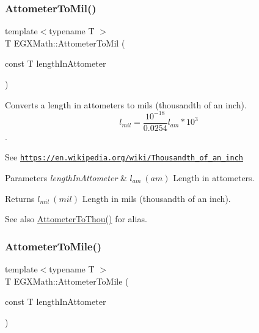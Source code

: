 \subsubsection{\texorpdfstring{Attometer\+To\+Mil()}{AttometerToMil()}}
{\footnotesize\ttfamily template$<$typename T $>$ \\
T E\+G\+X\+Math\+::\+Attometer\+To\+Mil (\begin{DoxyParamCaption}\item[{const T}]{length\+In\+Attometer }\end{DoxyParamCaption})}



Converts a length in attometers to mils (thousandth of an inch). \[ l_{mil}= \frac{10^{-18}}{0.0254} l_{am} * 10^{3} \]. 

See \href{https://en.wikipedia.org/wiki/Thousandth_of_an_inch}{\tt https\+://en.\+wikipedia.\+org/wiki/\+Thousandth\+\_\+of\+\_\+an\+\_\+inch} 
\begin{DoxyParams}{Parameters}
{\em length\+In\+Attometer} & $ l_{am}\ (am)$ Length in attometers. \\
\hline
\end{DoxyParams}
\begin{DoxyReturn}{Returns}
$ l_{mil}\ (mil)$ Length in mils (thousandth of an inch). 
\end{DoxyReturn}
\begin{DoxySeeAlso}{See also}
\mbox{\hyperlink{group___e_g_x_math-_conversions-_length_conversions-_s_i-_attometer-_imperial_gac9c9742b80b24da4e531fbcdc39976bb}{Attometer\+To\+Thou()}} for alias. 
\end{DoxySeeAlso}
\mbox{\label{group___e_g_x_math-_conversions-_length_conversions-_s_i-_attometer-_imperial_ga5525f722f588a2bb0a480c56d452fd3f}} 
\subsubsection{\texorpdfstring{Attometer\+To\+Mile()}{AttometerToMile()}}
{\footnotesize\ttfamily template$<$typename T $>$ \\
T E\+G\+X\+Math\+::\+Attometer\+To\+Mile (\begin{DoxyParamCaption}\item[{const T}]{length\+In\+Attometer }\end{DoxyParamCaption})}



